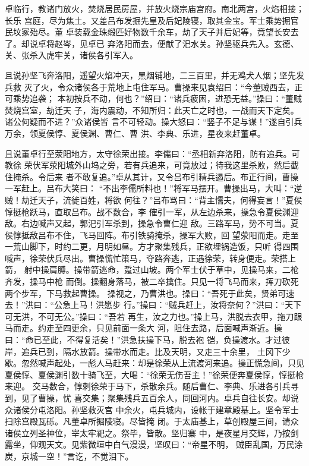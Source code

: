 卓临行，教诸门放火，焚烧居民房屋，并放火烧宗庙宫府。南北两宫，火焰相接；长乐
宫庭，尽为焦土。又差吕布发掘先皇及后妃陵寝，取其金宝。军士乘势掘官民坟冢殆尽。董
卓装载金珠缎匹好物数千余车，劫了天子并后妃等，竟望长安去了。却说卓将赵岑，见卓已
弃洛阳而去，便献了汜水关。孙坚驱兵先入。玄德、关、张杀入虎牢关，诸侯各引军入。

且说孙坚飞奔洛阳，遥望火焰冲天，黑烟铺地，二三百里，并无鸡犬人烟；坚先发兵救
灭了火，令众诸侯各于荒地上屯住军马。曹操来见袁绍曰：“今董贼西去，正可乘势追袭；
本初按兵不动，何也？”绍曰：“诸兵疲困，进恐无益。”操曰：“董贼焚烧宫室，劫迁天
子，海内震动，不知所归：此天亡之时也，一战而天下定矣。诸公何疑而不进？”众诸侯皆
言不可轻动。操大怒曰：“竖子不足与谋！”遂自引兵万余，领夏侯惇、夏侯渊、曹仁、曹
洪、李典、乐进，星夜来赶董卓。

且说董卓行至荥阳地方，太守徐荣出接。李儒曰：“丞相新弃洛阳，防有追兵。可教徐
荣伏军荥阳城外山坞之旁，若有兵追来，可竟放过；待我这里杀败，然后截住掩杀。令后来
者不敢复追。”卓从其计，又令吕布引精兵遏后。布正行间，曹操一军赶上。吕布大笑曰：
“不出李儒所料也！”将军马摆开。曹操出马，大叫：“逆贼！劫迁天子，流徙百姓，将欲
何往？”吕布骂曰：“背主懦夫，何得妄言！”夏侯惇挺枪跃马，直取吕布。战不数合，李
傕引一军，从左边杀来，操急令夏侯渊迎敌。右边喊声又起，郭汜引军杀到，操急令曹仁迎
敌。三路军马，势不可当。夏侯惇抵敌吕布不住，飞马回阵。布引铁骑掩杀，操军大败，回
望荥阳而走。走至一荒山脚下，时约二更，月明如昼。方才聚集残兵，正欲埋锅造饭，只听
得四围喊声，徐荣伏兵尽出。曹操慌忙策马，夺路奔逃，正遇徐荣，转身便走。荣搭上箭，
射中操肩膊。操带箭逃命，踅过山坡。两个军士伏于草中，见操马来，二枪齐发，操马中枪
而倒。操翻身落马，被二卒擒住。只见一将飞马而来，挥刀砍死两个步军，下马救起曹操。
操视之，乃曹洪也。操曰：“吾死于此矣，贤弟可速去！”洪曰：“公急上马！洪愿步
行。”操曰：“贼兵赶上，汝将奈何？”洪曰：“天下可无洪，不可无公。”操曰：“吾若
再生，汝之力也。”操上马，洪脱去衣甲，拖刀跟马而走。约走至四更余，只见前面一条大
河，阻住去路，后面喊声渐近。操曰：“命已至此，不得复活矣！”洪急扶操下马，脱去袍
铠，负操渡水。才过彼岸，追兵已到，隔水放箭。操带水而走。比及天明，又走三十余里，
土冈下少歇。忽然喊声起处，一彪人马赶来：却是徐荣从上流渡河来追。操正慌急间，只见
夏侯惇、夏侯渊引数十骑飞至，大喝：“徐荣无伤吾主！”徐荣便奔夏侯惇，惇挺枪来迎。
交马数合，惇刺徐荣于马下，杀散余兵。随后曹仁、李典、乐进各引兵寻到，见了曹操，忧
喜交集；聚集残兵五百余人，同回河内。卓兵自往长安。却说众诸侯分屯洛阳。孙坚救灭宫
中余火，屯兵城内，设帐于建章殿基上。坚令军士扫除宫殿瓦砾。凡董卓所掘陵寝。尽皆掩
闭。于太庙基上，草创殿屋三间，请众诸侯立列圣神位，宰太牢祀之。祭毕，皆散。坚归寨
中，是夜星月交辉，乃按剑露坐，仰观天文。见紫微垣中白气漫漫，坚叹曰：“帝星不明，
贼臣乱国，万民涂炭，京城一空！”言讫，不觉泪下。

